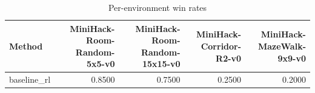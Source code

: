 \begin{table}[htbp]
\centering
\caption{Per-environment win rates}
\label{tab:per-env}
\begin{tabular}{lrrrr}
\toprule
\textbf{Method} & \textbf{MiniHack-Room-Random-5x5-v0} & \textbf{MiniHack-Room-Random-15x15-v0} & \textbf{MiniHack-Corridor-R2-v0} & \textbf{MiniHack-MazeWalk-9x9-v0} \\
\midrule
baseline\_rl & 0.8500 & 0.7500 & 0.2500 & 0.2000 \\
\bottomrule
\end{tabular}
\end{table}